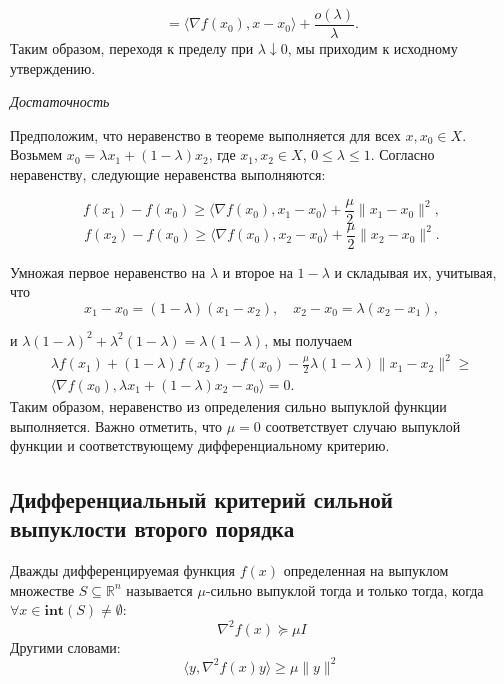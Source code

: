 \documentclass[
  russian,
  letterpaper,
  DIV=11,
  numbers=noendperiod]{scrartcl}
\begin{document}
\[
= \langle \nabla f(x_0), x - x_0 \rangle + \frac{o(\lambda)}{\lambda}. 
\] Таким образом, переходя к пределу при \(\lambda \downarrow 0\), мы
приходим к исходному утверждению.

\emph{Достаточность}

Предположим, что неравенство в теореме выполняется для всех
\(x, x_0 \in X\). Возьмем \(x_0 = \lambda x_1 + (1 - \lambda) x_2\), где
\(x_1, x_2 \in X\), \(0 \leq \lambda \leq 1\). Согласно неравенству,
следующие неравенства выполняются:

\[ 
f(x_1) - f(x_0) \geq \langle \nabla f(x_0), x_1 - x_0 \rangle + \frac{\mu}{2} \| x_1 - x_0 \|^2, 
\] \[ 
f(x_2) - f(x_0) \geq \langle \nabla f(x_0), x_2 - x_0 \rangle + \frac{\mu}{2} \| x_2 - x_0 \|^2. 
\]

Умножая первое неравенство на \(\lambda\) и второе на \(1 - \lambda\) и
складывая их, учитывая, что \[ 
x_1 - x_0 = (1 - \lambda)(x_1 - x_2), \quad x_2 - x_0 = \lambda(x_2 - x_1), 
\]

и
\(\lambda(1 - \lambda)^2 + \lambda^2(1 - \lambda) = \lambda(1 - \lambda)\),
мы получаем \[ 
\begin{split}
\lambda f(x_1) + (1 - \lambda) f(x_2) - f(x_0) - \frac{\mu}{2} \lambda (1 - \lambda) \| x_1 - x_2 \|^2 \geq \\
\langle \nabla f(x_0), \lambda x_1 + (1 - \lambda) x_2 - x_0 \rangle = 0. 
\end{split}
\] Таким образом, неравенство из определения сильно выпуклой функции
выполняется. Важно отметить, что \(\mu = 0\) соответствует случаю
выпуклой функции и соответствующему дифференциальному критерию.

\subsection{Дифференциальный критерий сильной выпуклости второго
порядка}\label{ux434ux438ux444ux444ux435ux440ux435ux43dux446ux438ux430ux43bux44cux43dux44bux439-ux43aux440ux438ux442ux435ux440ux438ux439-ux441ux438ux43bux44cux43dux43eux439-ux432ux44bux43fux443ux43aux43bux43eux441ux442ux438-ux432ux442ux43eux440ux43eux433ux43e-ux43fux43eux440ux44fux434ux43aux430}

Дважды дифференцируемая функция \(f(x)\) определенная на выпуклом
множестве \(S \subseteq \mathbb{R}^n\) называется \(\mu\)-сильно
выпуклой тогда и только тогда, когда
\(\forall x \in \mathbf{int}(S) \neq \emptyset\): \[
\nabla^2 f(x) \succeq \mu I
\] Другими словами: \[
\langle y, \nabla^2f(x)y\rangle \geq \mu \|y\|^2
\]
\end{document}
